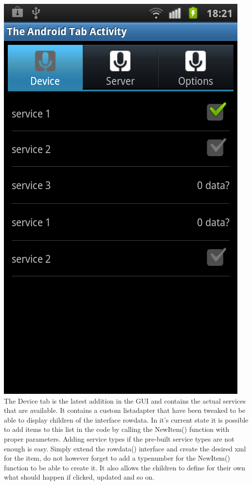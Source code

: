 \includegraphics[scale=0.50]{android-device.png}%
\\The Device tab is the latest addition in the GUI and contains the actual services that are available. It contains a custom listadapter that have been tweaked to be able to display children of the interface rowdata.
In it's current state it is possible to add items to this list in the code by calling the NewItem() function with proper parameters. Adding service types if the pre-built service types are not enough is easy. 
Simply extend the rowdata() interface and create the desired xml for the item, do not however forget to add a typenumber for the NewItem() function to be able to create it. 
It also allows the children to define for their own what should happen if clicked, updated and so on.






